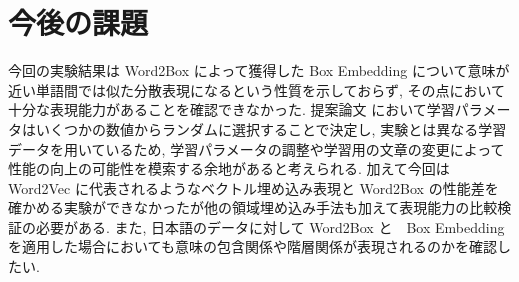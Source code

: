 \documentclass[twocolumn]{jarticle}     %
\begin{document}
\section{今後の課題}
今回の実験結果は Word2Box によって獲得した Box Embedding について意味が近い単語間では似た分散表現になるという性質を示しておらず, その点において十分な表現能力があることを確認できなかった. 
提案論文 \cite{dasgupta-etal-2022-word2box} において学習パラメータはいくつかの数値からランダムに選択することで決定し, 実験とは異なる学習データを用いているため, 学習パラメータの調整や学習用の文章の変更によって性能の向上の可能性を模索する余地があると考えられる. 
加えて今回は Word2Vec に代表されるようなベクトル埋め込み表現と Word2Box の性能差を確かめる実験ができなかったが他の領域埋め込み手法も加えて表現能力の比較検証の必要がある. 
また, 日本語のデータに対して Word2Box と　Box Embedding を適用した場合においても意味の包含関係や階層関係が表現されるのかを確認したい. 

\end{document}
